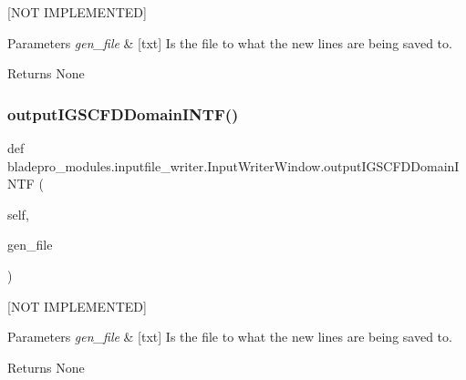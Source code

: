 \mbox{[}N\+OT I\+M\+P\+L\+E\+M\+E\+N\+T\+ED\mbox{]} 


\begin{DoxyParams}{Parameters}
{\em gen\+\_\+file} & \mbox{[}txt\mbox{]} Is the file to what the new lines are being saved to. \\
\hline
\end{DoxyParams}
\begin{DoxyReturn}{Returns}
None 
\end{DoxyReturn}
\hypertarget{classbladepro__modules_1_1inputfile__writer_1_1_input_writer_window_aa16a1dab2d93130c1cc0b4c24ec2caef}{}\label{classbladepro__modules_1_1inputfile__writer_1_1_input_writer_window_aa16a1dab2d93130c1cc0b4c24ec2caef} 
\subsubsection{\texorpdfstring{output\+I\+G\+S\+C\+F\+D\+Domain\+I\+N\+T\+F()}{outputIGSCFDDomainINTF()}}
{\footnotesize\ttfamily def bladepro\+\_\+modules.\+inputfile\+\_\+writer.\+Input\+Writer\+Window.\+output\+I\+G\+S\+C\+F\+D\+Domain\+I\+N\+TF (\begin{DoxyParamCaption}\item[{}]{self,  }\item[{}]{gen\+\_\+file }\end{DoxyParamCaption})}



\mbox{[}N\+OT I\+M\+P\+L\+E\+M\+E\+N\+T\+ED\mbox{]} 


\begin{DoxyParams}{Parameters}
{\em gen\+\_\+file} & \mbox{[}txt\mbox{]} Is the file to what the new lines are being saved to. \\
\hline
\end{DoxyParams}
\begin{DoxyReturn}{Returns}
None 
\end{DoxyReturn}
\hypertarget{classbladepro__modules_1_1inputfile__writer_1_1_input_writer_window_aa7a1b9b7db9021015b02a691075d88e3}{}\label{classbladepro__modules_1_1inputfile__writer_1_1_input_writer_window_aa7a1b9b7db9021015b02a691075d88e3} 
